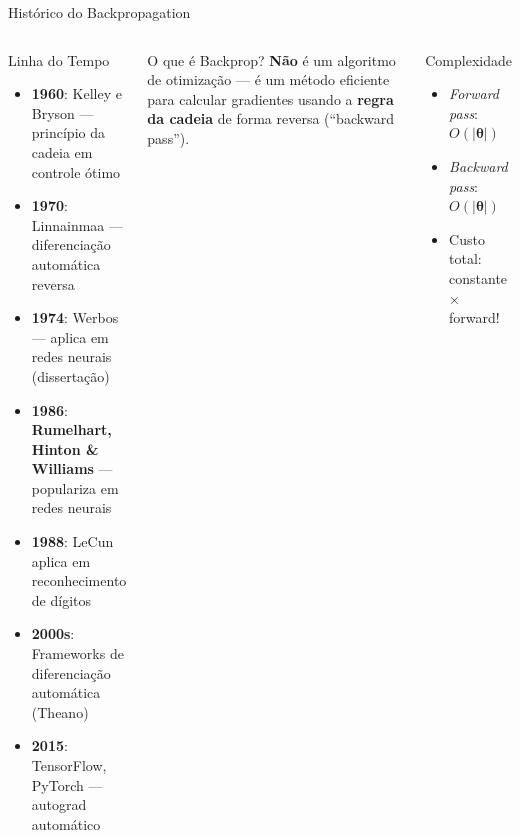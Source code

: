\documentclass[7pt, aspectratio=169,10pt]{beamer}
\newcommand{\btheta}{\bm{\theta}}
\begin{document}
\begin{frame}{Histórico do Backpropagation}
\begin{columns}[T]
\begin{block}{Linha do Tempo}
\small
\begin{itemize}
  \item \textbf{1960}: Kelley e Bryson — princípio da cadeia em controle ótimo
  \item \textbf{1970}: Linnainmaa — diferenciação automática reversa
  \item \textbf{1974}: Werbos — aplica em redes neurais (dissertação)
  \item \textbf{1986}: \textbf{Rumelhart, Hinton \& Williams} — populariza em redes neurais
  \item \textbf{1988}: LeCun aplica em reconhecimento de dígitos
  \item \textbf{2000s}: Frameworks de diferenciação automática (Theano)
  \item \textbf{2015}: TensorFlow, PyTorch — autograd automático
\end{itemize}
\end{block}
\begin{alertblock}{O que é Backprop?}
\small
\textbf{Não} é um algoritmo de otimização — é um método eficiente para calcular gradientes usando a \textbf{regra da cadeia} de forma reversa (``backward pass'').
\end{alertblock}
\begin{block}{Complexidade}
\small
\begin{itemize}
  \item \textit{Forward pass}: $O(|\btheta|)$
  \item \textit{Backward pass}: $O(|\btheta|)$ 
  \item Custo total: constante $\times$ forward!
\end{itemize}
\end{block}
\end{columns}
\end{frame}
\end{document}
